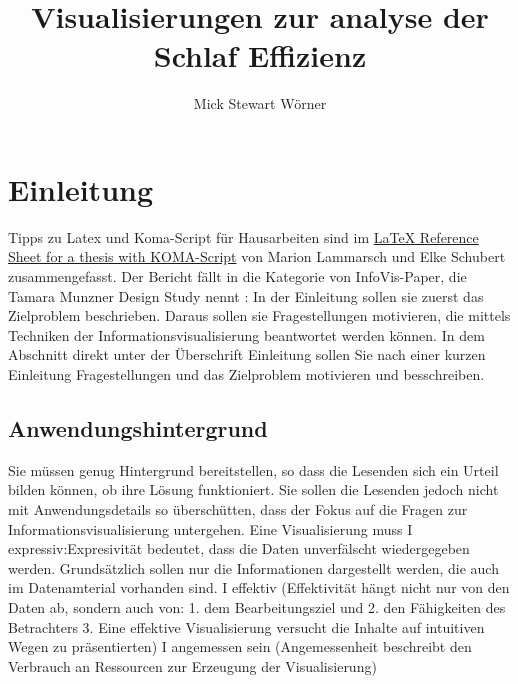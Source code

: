 \documentclass[usegeometry=true]{scrartcl}
\begin{document}
\subject{Projektbericht zum Modul Information Retrieval und Visualisierung Sommersemester 2023}
\title{Visualisierungen zur analyse der Schlaf Effizienz}
\author{Mick Stewart Wörner}%
\maketitle%

\section{Einleitung}
Tipps zu Latex und Koma-Script für Hausarbeiten sind im \href{http://mirrors.ctan.org/info/latex-refsheet/LaTeX_RefSheet.pdf}{LaTeX Reference Sheet for a thesis with KOMA-Script} von Marion Lammarsch und Elke Schubert zusammengefasst. 
Der Bericht fällt in die Kategorie von InfoVis-Paper, die Tamara Munzner Design Study nennt \cite{Munzner2008}: In der Einleitung sollen sie zuerst das Zielproblem beschrieben. Daraus sollen sie Fragestellungen motivieren, die mittels Techniken der Informationsvisualisierung beantwortet werden können. In dem Abschnitt direkt unter der Überschrift Einleitung sollen Sie nach einer kurzen Einleitung Fragestellungen und das Zielproblem motivieren und besschreiben. 

\subsection{Anwendungshintergrund}
Sie müssen genug Hintergrund bereitstellen, so dass die Lesenden sich ein Urteil bilden können, ob ihre Lösung funktioniert. Sie sollen die Lesenden jedoch nicht mit Anwendungsdetails so überschütten, dass der Fokus auf die Fragen zur Informationsvisualisierung untergehen. 
Eine Visualisierung muss
I expressiv:Expresivität bedeutet, dass die Daten unverfälscht wiedergegeben werden. Grundsätzlich sollen nur die Informationen dargestellt werden, die auch im Datenamterial vorhanden sind.
I effektiv (Effektivität hängt nicht nur von den Daten ab, sondern auch
von: 1. dem Bearbeitungsziel und 2. den Fähigkeiten des Betrachters 3. Eine effektive Visualisierung versucht die Inhalte auf intuitiven
Wegen zu präsentierten)
I angemessen sein (Angemessenheit beschreibt den Verbrauch an Ressourcen zur
Erzeugung der Visualisierung)
\end{document}
